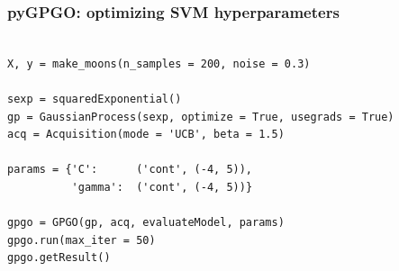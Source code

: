 \documentclass[10pt,usenames,dvipsnames]{beamer}
\begin{document}
\begin{frame}[fragile]
\frametitle{pyGPGO: optimizing SVM hyperparameters}
\begin{verbatim}
               
X, y = make_moons(n_samples = 200, noise = 0.3)
    
sexp = squaredExponential()
gp = GaussianProcess(sexp, optimize = True, usegrads = True)
acq = Acquisition(mode = 'UCB', beta = 1.5)

params = {'C':      ('cont', (-4, 5)),
          'gamma':  ('cont', (-4, 5))}

gpgo = GPGO(gp, acq, evaluateModel, params)
gpgo.run(max_iter = 50)
gpgo.getResult()
\end{verbatim}
\end{frame}
\end{document}
